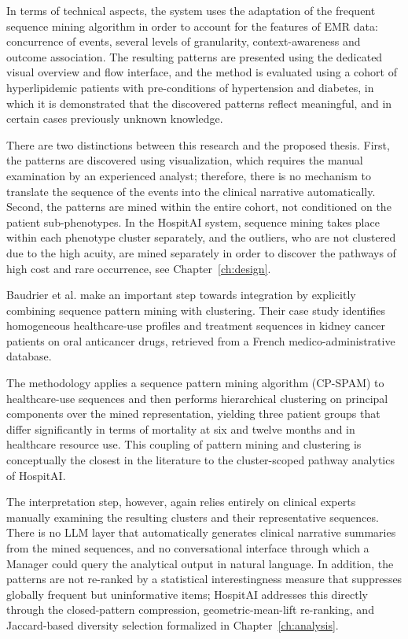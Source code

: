 In terms of technical aspects, the system uses the adaptation of the frequent sequence mining algorithm in order to account for the features of EMR data: concurrence of events, several levels of granularity, context-awareness and outcome association. The resulting patterns are presented using the dedicated visual overview and flow interface, and the method is evaluated using a cohort of hyperlipidemic patients with pre-conditions of hypertension and diabetes, in which it is demonstrated that the discovered patterns reflect meaningful, and in certain cases previously unknown knowledge.

There are two distinctions between this research and the proposed thesis. First, the patterns are discovered using visualization, which requires the manual examination by an experienced analyst; therefore, there is no mechanism to translate the sequence of the events into the clinical narrative automatically. Second, the patterns are mined within the entire cohort, not conditioned on the patient sub-phenotypes. In the HospitAI system, sequence mining takes place within each phenotype cluster separately, and the outliers, who are not clustered due to the high acuity, are mined separately in order to discover the pathways of high cost and rare occurrence, see Chapter~\ref{ch:design}.

Baudrier et al. \cite{baudrier2022} make an important step towards integration by explicitly combining sequence pattern mining with clustering. Their case study identifies homogeneous healthcare-use profiles and treatment sequences in kidney cancer patients on oral anticancer drugs, retrieved from a French medico-administrative database.

The methodology applies a sequence pattern mining algorithm (CP-SPAM) to healthcare-use sequences and then performs hierarchical clustering on principal components over the mined representation, yielding three patient groups that differ significantly in terms of mortality at six and twelve months and in healthcare resource use. This coupling of pattern mining and clustering is conceptually the closest in the literature to the cluster-scoped pathway analytics of HospitAI.

The interpretation step, however, again relies entirely on clinical experts manually examining the resulting clusters and their representative sequences. There is no LLM layer that automatically generates clinical narrative summaries from the mined sequences, and no conversational interface through which a Manager could query the analytical output in natural language. In addition, the patterns are not re-ranked by a statistical interestingness measure that suppresses globally frequent but uninformative items; HospitAI addresses this directly through the closed-pattern compression, geometric-mean-lift re-ranking, and Jaccard-based diversity selection formalized in Chapter~\ref{ch:analysis}.


